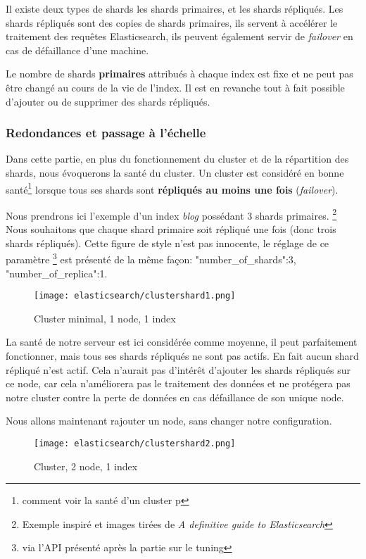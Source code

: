 {Il existe deux types de shards les shards primaires, et les shards répliqués.
Les shards répliqués sont des copies de shards primaires, ils servent à accélérer
le traitement des requêtes Elasticsearch, ils peuvent également servir de \emph{failover} 
en cas de défaillance d'une machine.

Le nombre de shards \textbf{primaires} attribués à chaque index est fixe et ne peut 
pas être changé au cours de la vie de l'index. Il est en revanche tout à fait possible
d'ajouter ou de supprimer des shards répliqués.

\subsubsection{Redondances et passage à l'échelle}
Dans cette partie, en plus du fonctionnement du cluster et de la répartition des shards,
nous évoquerons la santé du cluster. Un cluster est considéré en bonne santé\footnote{comment 
voir la santé d'un cluster p\pageref{lst:elastichealth}} lorsque tous ses
shards sont \textbf{répliqués au moins une fois} (\textit{failover}).

Nous prendrons ici l'exemple d'un index \emph{blog} possédant 3 shards primaires. 
\footnote{Exemple inspiré et images tirées de \textit{A definitive guide to Elasticsearch}}
Nous souhaitons que chaque shard primaire soit répliqué une fois (donc trois shards
répliqués). Cette figure de style n'est pas innocente, le réglage de ce paramètre
\footnote{via l'API présenté après la partie sur le tuning} est présenté de la même
façon: "number\_of\_shards":3, "number\_of\_replica":1. 


\begin{figure}[H]
\center
\texttt{[image: elasticsearch/clustershard1.png]}
\label{fig:clustershard1}
\caption{Cluster minimal, 1 node, 1 index}
\end{figure}

La santé de notre serveur est ici considérée comme moyenne, il peut parfaitement 
fonctionner, mais tous ses shards répliqués ne sont pas  actifs. En fait aucun 
shard répliqué n'est actif. Cela n'aurait pas d'intérêt d'ajouter les shards répliqués
sur ce node, car cela n'améliorera pas le traitement des données et ne protégera pas
notre cluster contre la perte de données en cas défaillance de son unique node.

Nous allons maintenant rajouter un node, sans changer notre configuration.

\begin{figure}[H]
\center
\texttt{[image: elasticsearch/clustershard2.png]}
\label{fig:clustershard2}
\caption{Cluster, 2 node, 1 index}
\end{figure}

}
